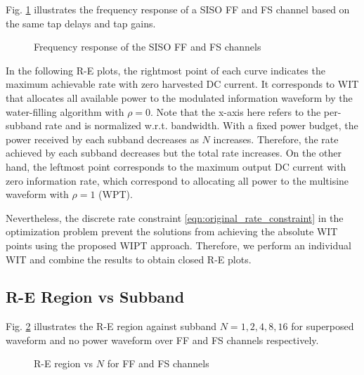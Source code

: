 Fig. \ref{fig:siso-channels} illustrates the frequency response of a SISO FF and FS channel based on the same tap delays and tap gains.

\begin{figure}[ht]
  \centering
  \caption{Frequency response of the SISO FF and FS channels}\label{fig:siso-channels}
\end{figure}

In the following R-E plots, the rightmost point of each curve indicates the maximum achievable rate with zero harvested DC current. It corresponds to WIT that allocates all available power to the modulated information waveform by the water-filling algorithm with $\rho  = 0$. Note that the x-axis here refers to the per-subband rate and is normalized w.r.t. bandwidth. With a fixed power budget, the power received by each subband decreases as $N$ increases. Therefore, the rate achieved by each subband decreases but the total rate increases. On the other hand, the leftmost point corresponds to the maximum output DC current with zero information rate, which correspond to allocating all power to the multisine waveform with $\rho  = 1$ (WPT).

Nevertheless, the discrete rate constraint \eqref{eqn:original_rate_constraint} in the optimization problem prevent the solutions from achieving the absolute WIT points using the proposed WIPT approach. Therefore, we perform an individual WIT and combine the results to obtain closed R-E plots.

\subsection{R-E Region vs Subband}\label{sec:re-region-vs-subband}
Fig. \ref{fig:siso-subband} illustrates the R-E region against subband $N = 1,2,4,8,16$ for superposed waveform and no power waveform over FF and FS channels respectively.

\begin{figure}[ht]
  \centering
  \quad
  \caption{R-E region vs $N$ for FF and FS channels}\label{fig:siso-subband}
\end{figure}

